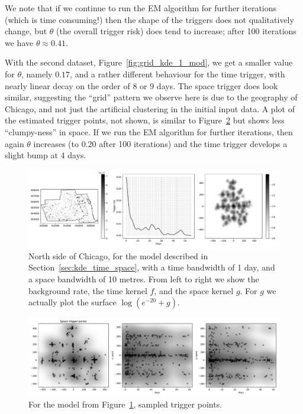 \documentclass[twoside,a4paper]{article}
\theoremstyle{plain}
\theoremstyle{definition}
\begin{document}
We note that if we continue to run the EM algorithm for further iterations (which is time
consuming!) then the shape of the triggers does not qualitatively change, but $\theta$ (the
overall trigger risk) does tend to increase; after 100 iterations we have $\theta\approx 0.41$.

With the second dataset, Figure~\ref{fig:grid_kde_1_mod},
we get a smaller value for $\theta$, namely $0.17$, and a rather different
behaviour for the time trigger, with nearly linear decay on the order of 8 or 9 days.  The space
trigger does look similar, suggesting the ``grid'' pattern we observe here is due to the geography
of Chicago, and not just the artificial clustering in the initial input data.
A plot of the estimated trigger points, not shown, is similar to Figure~\ref{fig:grid_kde_1a}
but shows less ``clumpy-ness'' in space.  If we run the EM algorithm for further iterations,
then again $\theta$ increases (to $0.20$ after 100 iterations) and the time trigger develops a
slight bump at 4 days.

\begin{figure}
  \includegraphics[width=\textwidth]{../notebooks/grid_kde_one.pdf}
  \caption{North side of Chicago, for the model described in Section~\ref{sec:kde_time_space},
  with a time bandwidth of 1 day, and a space bandwidth of 10 metres.  From left to right we show
  the background rate, the time kernel $f$, and the space kernel $g$.  For $g$ we actually plot
  the surface $\log(e^{-20}+g)$.}
  \label{fig:grid_kde_1}
\end{figure}

\begin{figure}
  \includegraphics[width=\textwidth]{../notebooks/grid_kde_onea.pdf}
  \caption{For the model from Figure~\ref{fig:grid_kde_1}, sampled trigger points.}
  \label{fig:grid_kde_1a}
\end{figure}
\end{document}
